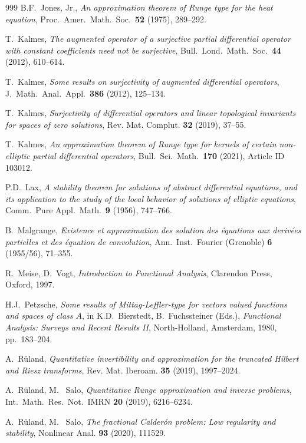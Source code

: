 \documentclass[12pt]{amsart}
\theoremstyle{definition}
\theoremstyle{remark}
\numberwithin{equation}{section}
\begin{document}
\begin{thebibliography}{999}
B.F.~Jones, Jr., \emph{An approximation theorem of Runge type for the heat equation}, Proc.\ Amer.\ Math.\ Soc.\ \textbf{52} (1975), 289--292.

T.~Kalmes, \emph{The augmented operator of a surjective partial differential operator with constant coefficients need not be surjective}, Bull.\ Lond.\ Math.\ Soc.\ \textbf{44} (2012), 610--614.

T.~Kalmes, \emph{Some results on surjectivity of augmented differential operators}, J.\ Math.\ Anal.\ Appl.\ \textbf{386} (2012), 125--134.

T.~Kalmes, \emph{Surjectivity of differential operators and linear topological invariants for spaces of zero solutions}, Rev. Mat. Complut. \textbf{32} (2019), 37--55.

T.~Kalmes, \emph{An approximation theorem of Runge type for kernels of certain non-elliptic partial differential operators}, Bull.\ Sci.\ Math.\ \textbf{170} (2021), Article ID 103012.

P.D.~Lax, \emph{A stability theorem for solutions of abstract differential equations, and its application to the study of the local behavior of solutions of elliptic equations}, Comm.\ Pure Appl.\ Math.\ \textbf{9} (1956), 747--766.

B.~Malgrange, \emph{Existence et approximation des solution des \'equations aux deriv\'ees partielles et des \'equation de convolution}, Ann.\ Inst.\ Fourier (Grenoble) \textbf{6} (1955/56), 71--355.

R.~Meise, D.~Vogt, \emph{Introduction to Functional Analysis}, Clarendon Press, Oxford, 1997.

H.J.~Petzsche, \emph{Some results of Mittag-Leffler-type for vectors valued functions and spaces of class $A$}, in K.D.~Bierstedt, B.~Fuchssteiner (Eds.), \emph{Functional Analysis: Surveys and Recent Results II}, North-Holland, Amsterdam, 1980, pp.\ 183--204.

A.~R\"{u}land, \emph{Quantitative invertibility and approximation for the truncated Hilbert and Riesz transforms}, Rev. Mat. Iberoam. \textbf{35} (2019), 1997--2024.

A.~R\"{u}land, M.~ Salo, \emph{Quantitative Runge approximation and inverse problems}, Int.\ Math.\ Res.\ Not.\ IMRN \textbf{20} (2019), 6216--6234.

A.~R\"{u}land, M.~ Salo, \emph{The fractional Calder\'on problem: Low regularity and stability}, Nonlinear Anal. \textbf{93} (2020), 111529.


\end{thebibliography}
\end{document}
